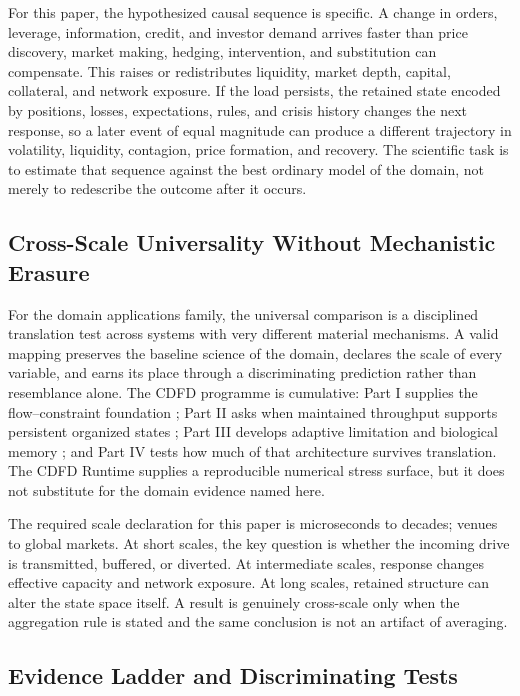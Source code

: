 \documentclass[11pt]{article}
\begin{document}
For this paper, the hypothesized causal sequence is specific. A change in
orders, leverage, information, credit, and investor demand arrives faster than price discovery, market making, hedging, intervention, and substitution can compensate.
This raises or redistributes liquidity, market depth, capital, collateral, and network exposure. If the load persists,
the retained state encoded by positions, losses, expectations, rules, and crisis history changes the next response, so a later event of equal
magnitude can produce a different trajectory in volatility, liquidity, contagion, price formation, and recovery. The
scientific task is to estimate that sequence against the best ordinary model of
the domain, not merely to redescribe the outcome after it occurs.

\subsection{Cross-Scale Universality Without Mechanistic Erasure}

For the domain applications family, the universal comparison is a disciplined translation test across systems with very different material mechanisms. A valid mapping preserves the baseline science of the domain, declares the scale of every variable, and earns its place through a discriminating prediction rather than resemblance alone. \cite{Holling1973,Turing1952,Shannon1948,BakTangWiesenfeld1987}
The CDFD programme is cumulative: Part I supplies the flow--constraint
foundation \cite{MujjabiPartI2026}; Part II asks when maintained throughput
supports persistent organized states \cite{MujjabiPartII2026}; Part III
develops adaptive limitation and biological memory \cite{MujjabiPartIII2026};
and Part IV \cite{MujjabiPartIV2026} tests how much of that architecture
survives translation. The CDFD Runtime \cite{CDFDRuntime2026} supplies a
reproducible numerical stress surface, but it does not substitute for the
domain evidence named here.

The required scale declaration for this paper is microseconds to decades; venues to global markets. At short
scales, the key question is whether the incoming drive is transmitted,
buffered, or diverted. At intermediate scales, response changes effective
capacity and network exposure. At long scales, retained structure can alter the
state space itself. A result is genuinely cross-scale only when the aggregation
rule is stated and the same conclusion is not an artifact of averaging.

\subsection{Evidence Ladder and Discriminating Tests}
\end{document}

